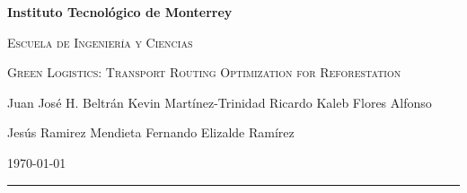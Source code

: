 \documentclass{amsart}
\begin{document}
    \begin{center}
        {\bfseries\LARGE Instituto Tecnológico de Monterrey\par}
        {\scshape\Large Escuela de Ingeniería y Ciencias\par}
        \vspace{0.5cm}
        {\scshape\Huge Green Logistics: Transport Routing Optimization for Reforestation\par}
        \vspace{0.5cm}
        {\small Juan José H. Beltrán \hspace{5pt} Kevin Martínez-Trinidad \hspace{5pt} Ricardo Kaleb Flores Alfonso \par Jesús Ramirez Mendieta \hspace{5pt} Fernando Elizalde Ramírez\par}
        \vspace{0.3cm}
        {\small \today}
        \vspace{0.5cm}
        
        \rule{16.5cm}{0.1pt}
    \end{center}
\end{document}
